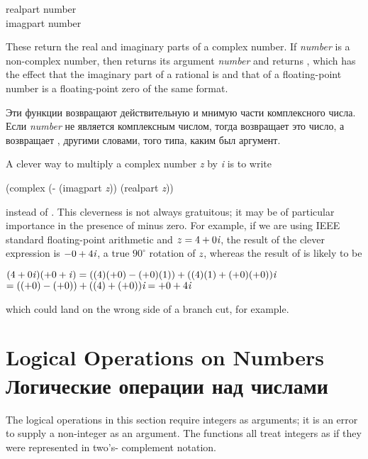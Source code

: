 \begin{defun}[Function]
realpart number \\
imagpart number

These return the real and imaginary parts of a complex number.  If
\emph{number} is a non-complex number, then  returns its
argument \emph{number} and 
returns , which
has the effect that the imaginary part of a rational is  and that of
a floating-point number is a floating-point zero of the same format.

Эти функции возвращают действительную и мнимую части комплексного числа. Если
\emph{number} не является комплексным числом, тогда  возвращает
это число, а  возвращает , другими
словами,  того типа, каким был аргумент.

\begin{newer}
A clever way to multiply a complex number \emph{z} by \emph{i} is to write
\begin{lisp}
(complex (- (imagpart \emph{z})) (realpart \emph{z}))
\end{lisp}
instead of .  This cleverness is not always
gratuitous; it may be of particular importance in the presence of minus
zero.  For example, if we are using IEEE standard floating-point arithmetic
and $z=4+0\emph{i}$, the result of the clever expression is $-0+4\emph{i}$, a true
$90^\circ$ rotation of $\emph{z}$, whereas the result of 
is likely to be
\begin{tabbing}
$ (4+0\emph{i\/})(+0+\emph{i\/}) = ((4)(+0) - (+0)(1)) + ((4)(1) + (+0)(+0))\emph{i} $ \\
\hskip2pc$ = ((+0)-(+0))+((4)+(+0))\emph{i} = +0+4\emph{i} $
\end{tabbing}
which could
land on the wrong side of a branch cut, for example.
\end{newer}
\end{defun}

\section{Logical Operations on Numbers Логические операции над числами}

The logical operations in this section require integers
as arguments; it is an error to supply a non-integer as an argument.
The functions all treat integers as if
they were represented in two's- complement notation.

